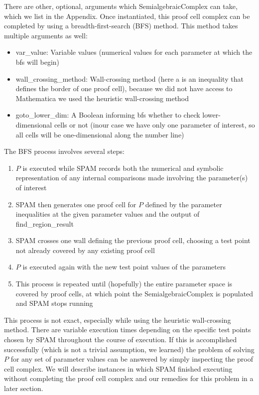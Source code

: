 \documentclass{article}
\begin{document}
There are other, optional, arguments which SemialgebraicComplex can take, which we list in the Appendix. Once instantiated, this proof cell complex can be completed by using a breadth-first-search (BFS) method. This method takes multiple arguments as well:

\begin{itemize}
    \item var\_value: Variable values (numerical values for each parameter at which the bfs will begin)
    \item wall\_crossing\_method: Wall-crossing method (here a  is an inequality that defines the border of one proof cell), because we did not have access to Mathematica we used the heuristic wall-crossing method
    \item goto\_lower\_dim: A Boolean informing bfs whether to check lower-dimensional cells or not (inour case we have only one parameter of interest, so all cells will be one-dimensional along the number line)
\end{itemize}

The BFS process involves several steps:
\begin{enumerate}
    \item $P$ is executed while SPAM records both the numerical and symbolic representation of any internal comparisons made involving the parameter(s) of interest
    \item SPAM then generates one proof cell for $P$ defined by the parameter inequalities at the given parameter values and the output of find\_region\_result
    \item SPAM crosses one wall defining the previous proof cell, choosing a test point not already covered by any existing proof cell
    \item $P$ is executed again with the new test point values of the parameters
    \item This process is repeated until (hopefully) the entire parameter space is covered by proof cells, at which point the SemialgebraicComplex is populated and SPAM stops running
\end{enumerate}

This process is not exact, especially while using the heuristic wall-crossing method. There are variable execution times depending on the specific test points chosen by SPAM throughout the course of execution. If this is accomplished successfully (which is not a trivial assumption, we learned) the problem of solving $P$ for any set of parameter values can be answered by simply inspecting the proof cell complex. We will describe instances in which SPAM finished executing without completing the proof cell complex and our remedies for this problem in a later section.
\end{document}
